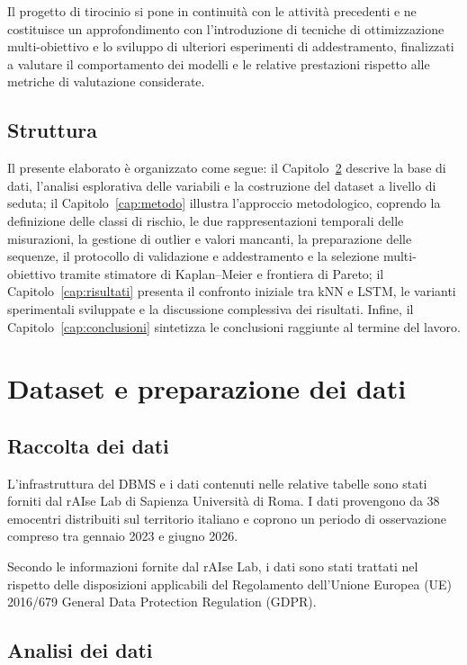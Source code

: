 \documentclass[a4paper,12pt]{report}
\begin{document}
Il progetto di tirocinio si pone in continuità con le attività precedenti e ne costituisce un approfondimento con l'introduzione di tecniche di ottimizzazione multi-obiettivo e lo sviluppo di ulteriori esperimenti di addestramento, finalizzati a valutare il comportamento dei modelli e le relative prestazioni rispetto alle metriche di valutazione considerate.

\section{Struttura}

Il presente elaborato è organizzato come segue: il Capitolo~\ref{cap:dataset} descrive la base di dati, l'analisi esplorativa delle variabili e la costruzione del dataset a livello di seduta; il Capitolo~\ref{cap:metodo} illustra l'approccio metodologico, coprendo la definizione delle classi di rischio, le due rappresentazioni temporali delle misurazioni, la gestione di outlier e valori mancanti, la preparazione delle sequenze, il protocollo di validazione e addestramento e la selezione multi-obiettivo tramite stimatore di Kaplan--Meier e frontiera di Pareto; il Capitolo~\ref{cap:risultati} presenta il confronto iniziale tra kNN e LSTM, le varianti sperimentali sviluppate e la discussione complessiva dei risultati. Infine, il Capitolo~\ref{cap:conclusioni} sintetizza le conclusioni raggiunte al termine del lavoro.

\chapter{Dataset e preparazione dei dati}
\label{cap:dataset}
\section{Raccolta dei dati}

L'infrastruttura del DBMS e i dati contenuti nelle relative tabelle sono stati forniti dal rAIse Lab di Sapienza Università di Roma. I dati provengono da 38 emocentri distribuiti sul territorio italiano e coprono un periodo di osservazione compreso tra gennaio 2023 e giugno 2026.

Secondo le informazioni fornite dal rAIse Lab, i dati sono stati trattati nel rispetto delle disposizioni applicabili del Regolamento dell'Unione Europea (UE) 2016/679 General Data Protection Regulation (GDPR).

\section{Analisi dei dati}
\end{document}
